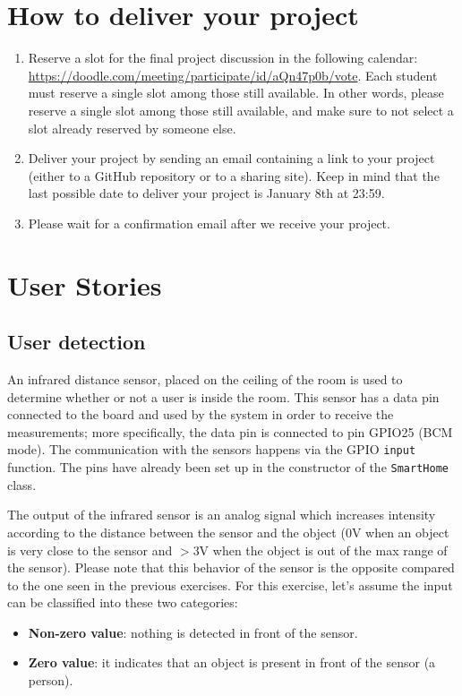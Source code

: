 \section{How to deliver your project}
\begin{enumerate}
    \item Reserve a slot for the final project discussion in the following calendar: \url{https://doodle.com/meeting/participate/id/aQn47p0b/vote}.
    Each student must reserve a single slot among those still available. In other words, please reserve a single slot among those still available, and make sure to not select a slot already reserved by someone else.
    \item Deliver your project by sending an email containing a link to your project (either to a GitHub repository or to a sharing site).
    Keep in mind that the last possible date to deliver your project is January 8th at 23:59. 
    \item Please wait for a confirmation email after we receive your project.
\end{enumerate}

\section{User Stories}
\subsection{User detection}
An infrared distance sensor, placed on the ceiling of the room is used to determine whether or not a user is inside the room. 
This sensor has a data pin connected to the board and used by the system in order to receive the measurements; more specifically, the data pin is connected to pin GPIO25 (BCM mode).
The communication with the sensors happens via the GPIO \texttt{input} function. The pins have already been set up in the constructor of the \texttt{SmartHome} class. 

The output of the infrared sensor is an analog signal which increases intensity according to the distance between the sensor and the object (\ie 0V when an object is very close to the sensor and $>$3V when the object is out of the max range of the sensor). 
Please note that this behavior of the sensor is the opposite compared to the one seen in the previous exercises.
For this exercise, let's assume the input can be classified into these two categories:
\begin{itemize}
    \item \textbf{Non-zero value}: nothing is detected in front of the sensor.
    \item \textbf{Zero value}: it indicates that an object is present in front of the sensor (\ie a person).
\end{itemize}

